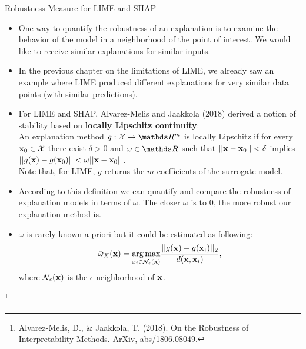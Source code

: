 \documentclass[11pt,compress,t,notes=noshow, xcolor=table]{beamer}
\begin{document}
\begin{vbframe}{Robustness Measure for LIME and SHAP}  
	\begin{itemize}
		\item One way to quantify the robustness of an explanation is to examine the behavior of the model in a neighborhood of the point of interest. We would like to receive similar explanations for similar inputs. 
		\item In the previous chapter on the limitations of LIME, we already saw an example where LIME produced different explanations for very similar data points (with similar predictions).
		\item For LIME and SHAP, Alvarez-Melis and Jaakkola (2018) derived a notion of stability based on \textbf{locally Lipschitz continuity}: \\
		An explanation method $g:\Xspace \rightarrow \R^m$ is locally Lipschitz if for every $\xv_0 \in \Xspace$ there exist $\delta > 0$ and $\omega \in \R$ such that $||\xv - \xv_0|| < \delta$ implies $||g(\xv) - g(\xv_0)|| < \omega ||\xv - \xv_0||$. \\
		\footnotesize Note that, for LIME, $g$ returns the $m$ coefficients of the surrogate model. \normalsize
		\item According to this definition we can quantify and compare the robustness of explanation models in terms of $\omega$. 
		The closer $\omega$ is to 0, the more robust our explanation method is. 
		\item $\omega$ is rarely known a-priori but it could be estimated as following: 
		$$\hat{\omega}_{X}(\xv) = \underset{x_i \in \mathcal{N}_{\epsilon}(\xv)}{\arg \max} \frac{||g(\xv) - g(\xv_i)||_2}{d(\xv, \xv_i)},$$
		where $\mathcal{N}_{\epsilon}(\xv)$ is the $\epsilon$-neighborhood of $\xv$.
	\end{itemize}
\vspace{2cm}
\footnote[frame]{Alvarez-Melis, D., \& Jaakkola, T. (2018). On the Robustness of Interpretability Methods. ArXiv, abs/1806.08049.}
\end{vbframe}

\end{document}
